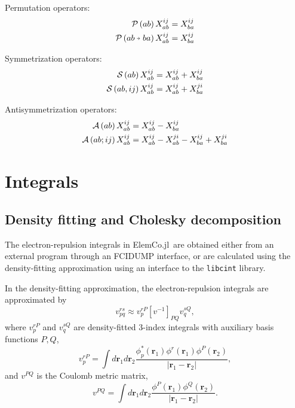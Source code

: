 \documentclass[a4paper,12pt,oneside]{book}
\newcommand{\veryshortarrow}[1][3pt]{\mathrel{%
   \hbox{\rule[\dimexpr\fontdimen22\textfont2-.2pt\relax]{#1}{.4pt}}%
   \mkern-4mu\hbox{\usefont{U}{lasy}{m}{n}\symbol{41}}}}
\newcommand{\vect}{\mathbf}
\newcommand{\perm}[1]{{\cal P}\left(#1\right)}
\newcommand{\Perm}[2]{{\cal P}\left({#1}\veryshortarrow {#2}\right)}
\newcommand{\sop}[1]{{\cal S}\left(#1\right)}
\newcommand{\Sop}[2]{{\cal S}\left(#1,#2\right)}
\newcommand{\asop}[1]{{\cal A}\left(#1\right)}
\newcommand{\ASop}[2]{{\cal A}\left(#1;#2\right)}
\newcommand{\elemcoil}{\textsf{ElemCo.jl}}
\begin{document}
Permutation operators:
\begin{equation}
\begin{aligned}
\perm{ab} X^{ij}_{ab} &= X^{ij}_{ba} \\
\Perm{ab}{ba} X^{ij}_{ab} &= X^{ij}_{ba} \\
\end{aligned}
\end{equation}

Symmetrization operators:
\begin{equation}
\begin{aligned}
\sop{ab} X^{ij}_{ab} &= X^{ij}_{ab} + X^{ij}_{ba}\\
\Sop{ab}{ij} X^{ij}_{ab} &= X^{ij}_{ab} + X^{ji}_{ba}\\
\end{aligned}
\end{equation}

Antisymmetrization operators:
\begin{equation}
\begin{aligned}
\asop{ab} X^{ij}_{ab} &= X^{ij}_{ab} - X^{ij}_{ba}\\
\ASop{ab}{ij} X^{ij}_{ab} &= X^{ij}_{ab} - X^{ji}_{ab} - X^{ij}_{ba} + X^{ji}_{ba}\\
\end{aligned}
\end{equation}


\chapter{Integrals}
\section{Density fitting and Cholesky decomposition}
\label{sec:df}
The electron-repulsion integrals in \elemcoil\ are obtained either from an external program 
through an FCIDUMP \cite{knowlesDeterminant1989} interface, 
or are calculated using the density-fitting approximation using an
interface to the \texttt{libcint}\cite{libcint} library.

In the density-fitting approximation, the electron-repulsion integrals are approximated by
\begin{equation}
  v_{pq}^{rs} \approx v_{p}^{rP} \left[v^{-1}\right]_{PQ} v_{q}^{sQ},
\end{equation}
where $v_{p}^{rP}$ and $v_{q}^{sQ}$ are density-fitted 3-index integrals with auxiliary 
basis functions $P,Q$, 
\begin{equation}
v_{p}^{rP} = \int d\vect{r}_1 d\vect{r}_2 \frac{\phi^*_p(\vect{r}_1) \phi^r(\vect{r}_1) \phi^P(\vect{r}_2)}{|\vect{r}_1-\vect{r}_2|},
\end{equation}
and $v^{PQ}$ is the Coulomb metric matrix,
\begin{equation}
  v^{PQ} = \int d\vect{r}_1 d\vect{r}_2 \frac{\phi^P(\vect{r}_1)\phi^Q(\vect{r}_2)}{|\vect{r}_1-\vect{r}_2|}.
\end{equation}
\end{document}
